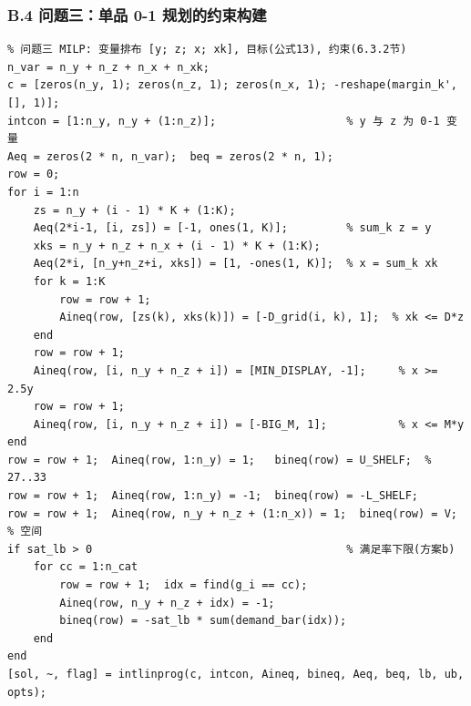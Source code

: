\subsubsection*{B.4 问题三：单品 0-1 规划的约束构建}

\begin{lstlisting}
% 问题三 MILP: 变量排布 [y; z; x; xk], 目标(公式13), 约束(6.3.2节)
n_var = n_y + n_z + n_x + n_xk;
c = [zeros(n_y, 1); zeros(n_z, 1); zeros(n_x, 1); -reshape(margin_k', [], 1)];
intcon = [1:n_y, n_y + (1:n_z)];                    % y 与 z 为 0-1 变量
Aeq = zeros(2 * n, n_var);  beq = zeros(2 * n, 1);
row = 0;
for i = 1:n
    zs = n_y + (i - 1) * K + (1:K);
    Aeq(2*i-1, [i, zs]) = [-1, ones(1, K)];         % sum_k z = y
    xks = n_y + n_z + n_x + (i - 1) * K + (1:K);
    Aeq(2*i, [n_y+n_z+i, xks]) = [1, -ones(1, K)];  % x = sum_k xk
    for k = 1:K
        row = row + 1;
        Aineq(row, [zs(k), xks(k)]) = [-D_grid(i, k), 1];  % xk <= D*z
    end
    row = row + 1;
    Aineq(row, [i, n_y + n_z + i]) = [MIN_DISPLAY, -1];     % x >= 2.5y
    row = row + 1;
    Aineq(row, [i, n_y + n_z + i]) = [-BIG_M, 1];           % x <= M*y
end
row = row + 1;  Aineq(row, 1:n_y) = 1;   bineq(row) = U_SHELF;  % 27..33
row = row + 1;  Aineq(row, 1:n_y) = -1;  bineq(row) = -L_SHELF;
row = row + 1;  Aineq(row, n_y + n_z + (1:n_x)) = 1;  bineq(row) = V; % 空间
if sat_lb > 0                                       % 满足率下限(方案b)
    for cc = 1:n_cat
        row = row + 1;  idx = find(g_i == cc);
        Aineq(row, n_y + n_z + idx) = -1;
        bineq(row) = -sat_lb * sum(demand_bar(idx));
    end
end
[sol, ~, flag] = intlinprog(c, intcon, Aineq, bineq, Aeq, beq, lb, ub, opts);
\end{lstlisting}

